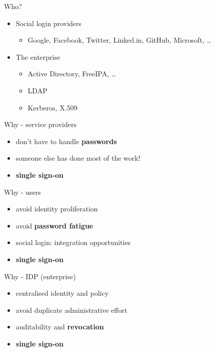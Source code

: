\documentclass[ignorenonframetext,aspectratio=169]{beamer}
\providecommand{\tightlist}{%
  \setlength{\itemsep}{0pt}\setlength{\parskip}{0pt}}
\begin{document}
\begin{frame}{Who?}
\begin{itemize}

\tightlist
\item Social login providers
\begin{itemize}
\tightlist
\item Google, Facebook, Twitter, Linked.in, GitHub, Microsoft, \ldots
\end{itemize}

\item{The enterprise}
\begin{itemize}
\tightlist
\item Active Directory, FreeIPA, \ldots
\item LDAP
\item Kerberos, X.509
\end{itemize}

\end{itemize}
\end{frame}

\begin{frame}{Why - service providers}

\begin{itemize}
\tightlist
\item don't have to handle {\bf passwords}
\item someone else has done most of the work!
\item \bf single sign-on
\end{itemize}

\end{frame}

\begin{frame}{Why - users}

\begin{itemize}
\tightlist
\item avoid identity proliferation
\item avoid {\bf password fatigue}
\item social login: integration opportunities
\item \bf single sign-on
\end{itemize}

\end{frame}

\begin{frame}{Why - IDP (enterprise)}

\begin{itemize}
\tightlist
\item centralised identity and policy
\item avoid duplicate administrative effort
\item auditability and {\bf revocation}
\item \bf single sign-on
\end{itemize}

\end{frame}
\end{document}
